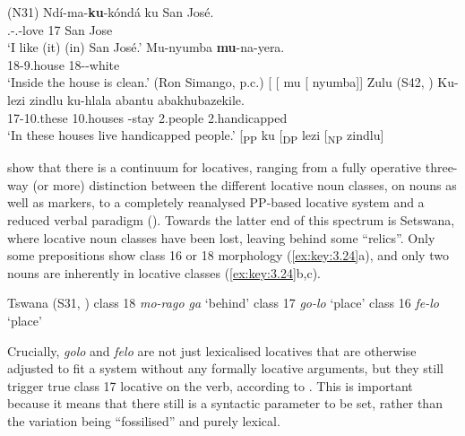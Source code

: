 \documentclass[output=paper]{langsci/langscibook}
\begin{document}
\ea\label{ex:key:3.22}  (N31)
	\ea
	\gll	 Ndí-ma-\textbf{ku}{}-kóndá  ku  San José. \\
	    \Fsg.\Sm{}{}-\Prs{}.\Om{}-love  17  San Jose\\
	\glt    ‘I like (it) (in) San José.’        \citep[58]{Bresnan1991}
	\ex
	\gll	 Mu-nyumba  \textbf{mu}{}-na-yera.\\
	    18-9.house  18\Sm{}-\Pst{}-white\\
	\glt    ‘Inside the house is clean.’  (Ron Simango, p.c.)
    \sn {}[ [ mu [ nyumba]]
	\z
\z
\newpage
\ea\label{ex:key:3.23}Zulu (S42, \citealt{Buell2007})
    \sn
        \gll Ku-lezi  zindlu  ku-hlala  abantu  abakhubazekile. \\
         17-10.these  10.houses  \Expl-stay  2.people  2.handicapped\\
        \glt ‘In these houses live handicapped people.’
    \sn {}[\textsubscript{PP} ku\textsubscript{} [\textsubscript{DP} lezi [\textsubscript{NP} zindlu]
\z

\citet{RiedelMarten2012} show that there is a continuum for  locatives,
ranging from a fully operative three-way (or more) distinction between the
different locative noun classes, on nouns as well as  markers, to a
completely reanalysed PP-based locative system and a reduced verbal 
paradigm (\citealt{DemuthMmusi1997,Creissels2011}). Towards the latter end of
this spectrum is Setswana, where locative noun classes have been lost, leaving
behind some “relics”. Only some prepositions show class 16 or 18 morphology
(\ref{ex:key:3.24}a), and only two nouns are inherently in locative classes
(\ref{ex:key:3.24}b,c).

\ea\label{ex:key:3.24} Tswana (S31, \citealt{Creissels2011})
    \ea class 18 \emph{mo-rago ga} ‘behind’
    \ex class 17 \emph{go-lo} ‘place’
    \ex class 16 \emph{fe-lo} ‘place’
    \z
\z

Crucially, \emph{golo} and \emph{felo} are not just lexicalised locatives that
are otherwise adjusted to fit a system without any formally locative arguments,
but they still trigger true class 17 locative  on the verb, according
to \citet{Creissels2011}. This is important because it means that there still
is a syntactic parameter to be set, rather than the variation being
“fossilised” and purely lexical.
\end{document}
